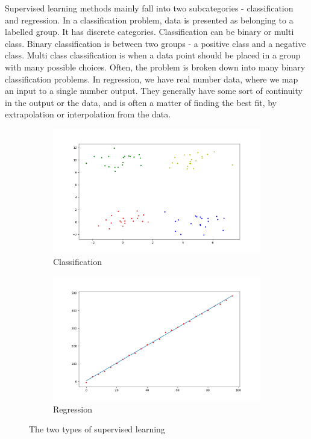 \documentclass{article}
\begin{document}
Supervised learning methods mainly fall into two subcategories - classification and regression. In a classification problem, data is presented as belonging to a labelled group. It has discrete categories. Classification can be binary or multi class. Binary classification is between two groups - a positive class and a negative class. Multi class classification is when a data point should be placed in a group with many possible choices. Often, the problem is broken down into many binary classification problems. In regression, we have real number data, where we map an input to a single number output. They generally have some sort of continuity in the output or the data, and is often a matter of finding the best fit, by extrapolation or interpolation from the data. 

\begin{figure}[H]
\centering
\begin{subfigure}{.5\textwidth}
  \centering
  \includegraphics[width=\linewidth]{Images/classification.png}
  \caption{Classification}
\end{subfigure}%
\begin{subfigure}{.5\textwidth}
  \centering
  \includegraphics[width=\linewidth]{Images/regression.png}
  \caption{Regression}
\end{subfigure}
\caption{The two types of supervised learning}
\end{figure}
\end{document}
